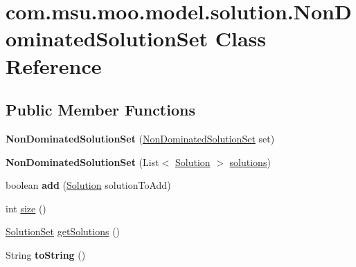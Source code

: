 \hypertarget{classcom_1_1msu_1_1moo_1_1model_1_1solution_1_1NonDominatedSolutionSet}{\section{com.\-msu.\-moo.\-model.\-solution.\-Non\-Dominated\-Solution\-Set Class Reference}
\label{classcom_1_1msu_1_1moo_1_1model_1_1solution_1_1NonDominatedSolutionSet}
}
\subsection*{Public Member Functions}
\begin{DoxyCompactItemize}
\item 
\hypertarget{classcom_1_1msu_1_1moo_1_1model_1_1solution_1_1NonDominatedSolutionSet_a4c3b6cdd3d13eec16962105474d4b6ca}{{\bfseries Non\-Dominated\-Solution\-Set} (\hyperlink{classcom_1_1msu_1_1moo_1_1model_1_1solution_1_1NonDominatedSolutionSet}{Non\-Dominated\-Solution\-Set} set)}\label{classcom_1_1msu_1_1moo_1_1model_1_1solution_1_1NonDominatedSolutionSet_a4c3b6cdd3d13eec16962105474d4b6ca}

\item 
\hypertarget{classcom_1_1msu_1_1moo_1_1model_1_1solution_1_1NonDominatedSolutionSet_a1a9f64544c83cff6b7caab2de1689505}{{\bfseries Non\-Dominated\-Solution\-Set} (List$<$ \hyperlink{classcom_1_1msu_1_1moo_1_1model_1_1solution_1_1Solution}{Solution} $>$ \hyperlink{classcom_1_1msu_1_1moo_1_1model_1_1solution_1_1NonDominatedSolutionSet_a9c1ad52b072eabc7faff33b81f86c4d4}{solutions})}\label{classcom_1_1msu_1_1moo_1_1model_1_1solution_1_1NonDominatedSolutionSet_a1a9f64544c83cff6b7caab2de1689505}

\item 
\hypertarget{classcom_1_1msu_1_1moo_1_1model_1_1solution_1_1NonDominatedSolutionSet_a3658a7572377ba1ba0055e01de918034}{boolean {\bfseries add} (\hyperlink{classcom_1_1msu_1_1moo_1_1model_1_1solution_1_1Solution}{Solution} solution\-To\-Add)}\label{classcom_1_1msu_1_1moo_1_1model_1_1solution_1_1NonDominatedSolutionSet_a3658a7572377ba1ba0055e01de918034}

\item 
int \hyperlink{classcom_1_1msu_1_1moo_1_1model_1_1solution_1_1NonDominatedSolutionSet_a8a408462f28e01a2f32c292daeb68ac9}{size} ()
\item 
\hyperlink{classcom_1_1msu_1_1moo_1_1model_1_1solution_1_1SolutionSet}{Solution\-Set} \hyperlink{classcom_1_1msu_1_1moo_1_1model_1_1solution_1_1NonDominatedSolutionSet_a1fcaff0392af7b98d4dc6c9016829a49}{get\-Solutions} ()
\item 
\hypertarget{classcom_1_1msu_1_1moo_1_1model_1_1solution_1_1NonDominatedSolutionSet_a914b87fe2969b3d7f24f7bf018b5ee9f}{String {\bfseries to\-String} ()}\label{classcom_1_1msu_1_1moo_1_1model_1_1solution_1_1NonDominatedSolutionSet_a914b87fe2969b3d7f24f7bf018b5ee9f}


\end{DoxyCompactItemize}
